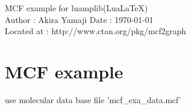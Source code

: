 \documentclass{article}
\begin{document}
\begin{center}
 {\Huge\sf MCF example for luamplib(Lua\LaTeX)}\vspace{5mm}\\
 Author : Akira Yamaji \quad Date : \today\\
 Located at : http://www.ctan.org/pkg/mcf2graph\vspace{2mm}\\
\end{center}
\section{MCF example}
\noindent%
 use molecular data base file 'mcf\_exa\_data.mcf'\\
\end{document}
